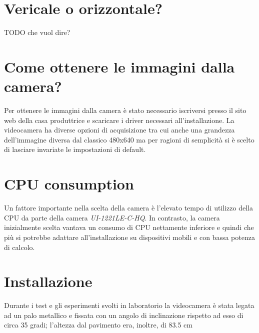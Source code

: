 \section{Vericale o orizzontale?}
TODO che vuol dire?
\section{Come ottenere le immagini dalla camera?}
Per ottenere le immagini dalla camera è stato necessario iscriversi presso il sito web della casa produttrice e scaricare i driver necessari all'installazione.
La videocamera ha diverse opzioni di acquisizione tra cui anche una grandezza dell'immagine diversa dal classico 480x640 ma per ragioni di semplicità si è scelto di lasciare invariate le impostazioni di default.

\section{CPU consumption}
Un fattore importante nella scelta della camera è l'elevato tempo di utilizzo della CPU da parte della camera \textit{UI-1221LE-C-HQ}. In contrasto, la camera inizialmente scelta vantava un consumo di CPU nettamente inferiore e quindi che più si potrebbe adattare all'installazione su dispositivi mobili e con bassa potenza di calcolo.

\section{Installazione}

Durante i test e gli esperimenti svolti in laboratorio la videocamera è stata legata ad un palo metallico e fissata con un angolo di inclinazione rispetto ad esso di circa 35 gradi; l'altezza dal pavimento era, inoltre, di 83.5 cm

